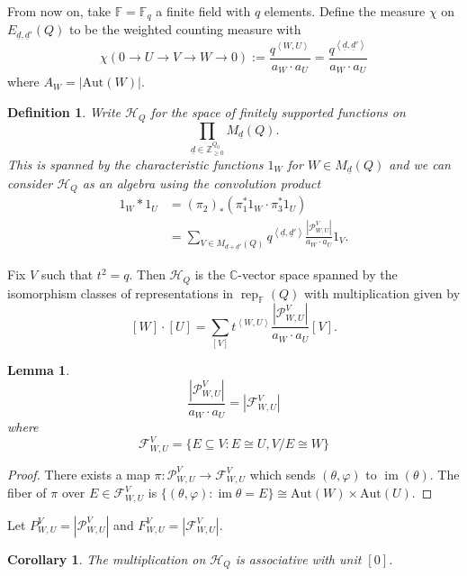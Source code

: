 \documentclass{book}
\newtheorem{lemma}[theorem]{Lemma}
\newtheorem{corollary}[theorem]{Corollary}
\newtheorem{definition}[theorem]{Definition}
\DeclareMathOperator{\rep}{rep}
\DeclareMathOperator{\im}{im}
\begin{document}
    From now on, take $\mathbb{F}=\mathbb{F}_q$ a finite field with $q$ elements. Define the measure $\chi$ on $E_{\underline{d},\underline{d}'}(Q)$ to be the weighted counting measure with 
    \[\chi\left(0\to U\to  V\to W\to 0\right):=\frac{q^{\left<W,U\right>}}{a_W \cdot a_U}=\frac{q^{\left<\underline{d},\underline{d}'\right>}}{a_W\cdot a_U} \]
    where $A_W=|\text{Aut}(W)|$.
    
    \begin{definition}
        Write $\mathcal{H}_Q$ for the space of finitely supported functions on \[\prod_{\underline{d}\in\mathbb{Z}_{\geq 0}^{Q_0}} M_{\underline{d}}(Q).\] This is spanned by the characteristic functions $1_W$ for $W\in M_{\underline{d}}(Q)$ and we can consider $\mathcal{H}_Q$ as an algebra using the convolution product
        \begin{align*}
            1_W*1_U &= (\pi_2)_*(\pi_1^*1_W\cdot \pi_3^*1_U)\\
            &= \sum_{V\in M_{\underline{d}+\underline{d}'}(Q)}q^{\left<\underline{d},\underline{d}'\right>}\frac{|\mathcal{P}_{W,U}^V|}{a_W\cdot a_U}1_V.
        \end{align*}
    \end{definition}
    
     Fix $V$ such that $t^2=q$. Then $\mathcal{H}_Q$ is the $\mathbb{C}$-vector space spanned by the isomorphism classes of representations in $\rep_\mathbb{F}(Q)$ with multiplication given by
    \[[W]\cdot[U]=\sum_{[V]}t^{\left< W,U \right> }\frac{|\mathcal{P}_{W,U}^V|}{a_W\cdot a_U}[V].\] 
    
    \begin{lemma}
    	\[\frac{|\mathcal{P}_{W,U}^V|}{a_W\cdot a_U}=|\mathcal{F}_{W,U}^V|\] where \[\mathcal{F}_{W,U}^V=\{E\subseteq V : E\cong U, V/E \cong W\}\]
    \end{lemma}
    \begin{proof}
    	There exists a map $\pi:\mathcal{P}_{W,U}^V\to\mathcal{F}_{W,U}^V$ which sends $(\theta,\varphi)$ to $\im(\theta)$. The fiber of $\pi$ over $E\in \mathcal{F}_{W,U}^V$ is $\{(\theta,\varphi):\im\theta = E\}\cong\text{Aut}(W)\times\text{Aut}(U)$.
    \end{proof}
    
    Let $P_{W,U}^V=|\mathcal{P}_{W,U}^V|$ and $F_{W,U}^V=|\mathcal{F}_{W,U}^V|$.
    
    \begin{corollary}
        The multiplication on $\mathcal{H}_Q$ is associative with unit $[0]$.
    \end{corollary}
    
\end{document}
